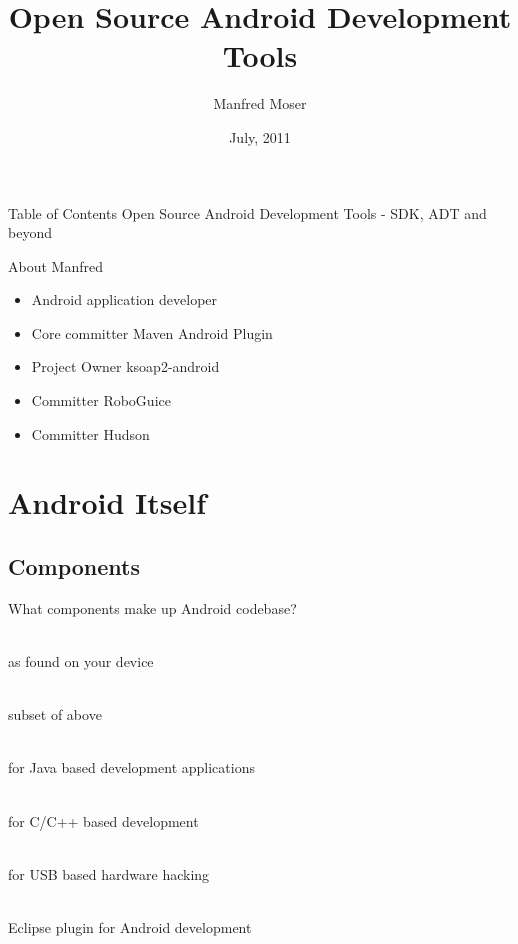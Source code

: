 \documentclass[aspectratio=169]{beamer}
\title{Open Source Android Development Tools}
\author{Manfred Moser}
\date{July, 2011}
\institute{simpligility technologies inc.}
\begin{document}
\begin{frame}
  \titlepage
\end{frame}

\begin{frame}{Table of Contents}
  Open Source Android Development Tools - SDK, ADT and beyond
  \setcounter{tocdepth}{1}
  \tableofcontents
\end{frame}

\begin{frame}{About Manfred}
  \begin{itemize}
    \item<1-> Android application developer
    \item<2-> Core committer Maven Android Plugin
    \item<3-> Project Owner ksoap2-android
    \item<4-> Committer RoboGuice
    \item<5-> Committer Hudson
  \end{itemize}

\end{frame}


\section{Android Itself}

  \subsection{Components}
    \begin{frame}{What components make up Android codebase?}
      \begin{description}
        \item<1->[Android Proper] \hfill \\ as found on your device
        \item<2->[Android Open Source Project AOSP] \hfill  \\ subset of above 
        \item<3->[Android Software Development Kit SDK] \hfill  \\ for Java based development applications
        \item<4->[Android Native Development Kit NDK] \hfill  \\ for C/C++ based development
        \item<5->[Android Open Accessory Development Kit ADK] \hfill \\ for USB based hardware hacking
        \item<6->[Android Development Toolkit ADT] \hfill  \\ Eclipse plugin for Android development  
      \end{description}
    \end{frame}
\end{document}
